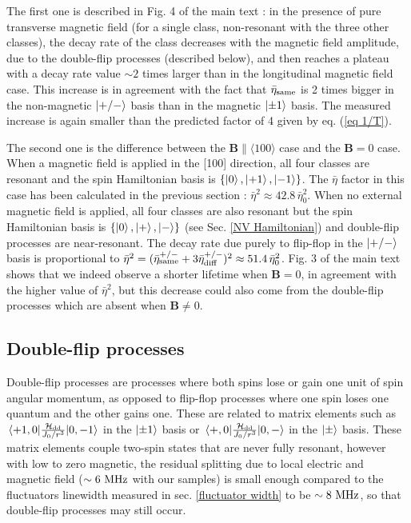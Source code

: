\documentclass[preprintnumbers,amsmath,amssymb,onecolumn,12pt]{revtex4-2}\usepackage{graphicx}%
\begin{document}
The first one is described in Fig. 4 of the main text : in the presence of pure transverse magnetic field (for a single class, non-resonant with the three other classes), the decay rate of the class decreases with the magnetic field amplitude, due to the double-flip processes (described below), and then reaches a plateau with a decay rate value $\sim 2$ times larger than in the longitudinal magnetic field case. This increase is in agreement with the fact that $\bar{\eta}_{\rm same}$ is 2 times bigger in the non-magnetic $\ket{+/-}$ basis than in the magnetic $\ket{\pm 1}$ basis. The measured increase is again smaller than the predicted factor of 4 given by eq. (\ref{eq 1/T}).

The second one is the difference between the $\bm{B} \parallel \langle 100 \rangle$ case and the $\bm{B}=0$ case. When a magnetic field is applied in the [100] direction, all four classes are resonant and the spin Hamiltonian basis is $\{ \ket{0},\ket{+1},\ket{-1} \} $. The $\bar \eta$ factor in this case has been calculated in the previous section : $\bar \eta^2\approx 42.8\, \bar \eta_0^2$. When no external magnetic field is applied, all four classes are also resonant but the spin Hamiltonian basis is  $\{ \ket{0},\ket{+},\ket{-} \} $ (see Sec. \ref{NV Hamiltonian}) and double-flip processes are near-resonant. The decay rate due purely to flip-flop in the $\ket{+/-}$ basis is proportional to $\bar \eta^2 = (\bar{\eta}_{\rm same}^{+/-} + 3\bar{\eta}_{\rm diff}^{+/-})^2 \approx 51.4\, \bar \eta_0^2$. Fig. 3 of the main text shows that we indeed observe a shorter lifetime when $\bm B=0$, in agreement with the higher value of $\bar \eta^2$, but this decrease could also come from the double-flip processes which are absent when $\bm B \neq 0$.

\subsection{Double-flip processes}

Double-flip processes are processes where both spins lose or gain one unit of spin angular momentum, as opposed to flip-flop processes where one spin loses one quantum and the other gains one. These are related to matrix elements  such as $\mel{+1,0}{\frac{\mathcal{H}_{\rm dd}}{J_0/r^3}}{0,-1}$ in the $\ket{\pm 1}$ basis or $\mel{+,0}{\frac{\mathcal{H}_{\rm dd}}{J_0/r^3}}{0,-}$ in the $\ket{\pm}$ basis. These matrix elements couple two-spin states that are never fully resonant, however with low to zero magnetic, the residual splitting due to local electric and magnetic field ($\sim 6\ \rm MHz$ with our samples) is small enough compared to the fluctuators linewidth  measured in sec. \ref{fluctuator width} to be $\sim 8\ \rm MHz$, so that double-flip processes may still occur.
\end{document}
